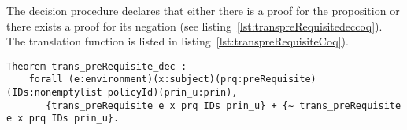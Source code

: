 The decision procedure  declares that either there is a proof for the proposition  or there exists a proof for its negation (see listing~\ref{lst:transpreRequisitedeccoq}). The translation function  is listed in listing~\ref{lst:transpreRequisiteCoq}). 


\begin{lstlisting}
Theorem trans_preRequisite_dec :
    forall (e:environment)(x:subject)(prq:preRequisite)(IDs:nonemptylist policyId)(prin_u:prin),
       {trans_preRequisite e x prq IDs prin_u} + {~ trans_preRequisite e x prq IDs prin_u}.
\end{lstlisting}


